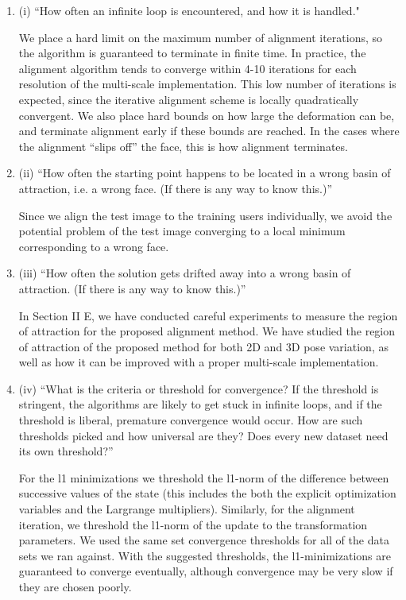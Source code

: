 \documentclass[11pt]{article}
\begin{document}
\begin{enumerate}
\item (i) ``How often an infinite loop is encountered, and how it is handled."

We place a hard limit on the maximum number of alignment iterations, so the
algorithm is guaranteed to terminate in finite time.  In practice, the
alignment algorithm tends to converge within 4-10 iterations for each
resolution of the multi-scale implementation. This low number of iterations is expected, since the iterative alignment scheme is locally quadratically convergent. We also place hard bounds on how
large the deformation can be, and terminate alignment early if these bounds are
reached.  In the cases where the alignment ``slips off'' the face, this is how
alignment terminates.  

\item (ii) ``How often the starting point happens to be located in a wrong basin of
attraction, i.e. a wrong face. (If there is any way to know this.)''

Since we align the test image to the training users individually, we avoid the
potential problem of the test image converging to a local minimum corresponding
to a wrong face.

\item (iii) ``How often the solution gets drifted away into a wrong basin of
attraction. (If there is any way to know this.)''

In Section II E, we have conducted careful experiments to measure the region of attraction
for the proposed alignment method. We have studied the region of attraction of the proposed
method for both 2D and 3D pose variation, as well as how it can be improved with a proper
multi-scale implementation. 

\item (iv) ``What is the criteria or threshold for convergence? If the threshold is
stringent, the algorithms are likely to get stuck in infinite loops, and if the
threshold is liberal, premature convergence would occur. How are such
thresholds picked and how universal are they? Does every new dataset need its
own threshold?''

For the l1 minimizations we threshold the l1-norm of the difference between
successive values of the state (this includes the both the explicit
optimization variables and the Largrange multipliers).  Similarly, for the
alignment iteration, we threshold the l1-norm of the update to the
transformation parameters.  We used the same set convergence thresholds for all
of the data sets we ran against.  With the suggested thresholds, the l1-minimizations are
guaranteed to converge eventually, although convergence may be very slow if they
are chosen poorly.  


\end{enumerate}
\end{document}

